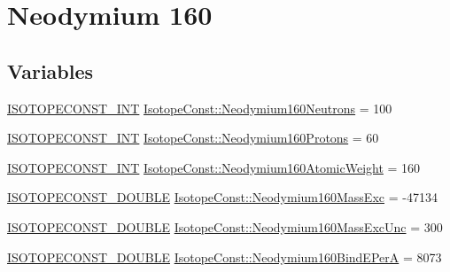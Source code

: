\hypertarget{group___isotope_const-_neodymium-_nd160}{}\section{Neodymium 160}
\label{group___isotope_const-_neodymium-_nd160}
\subsection*{Variables}
\begin{DoxyCompactItemize}
\item 
\mbox{\hyperlink{group___isotope_const-_macros_ga5f18360b3e99483a35c32d789e62621c}{I\+S\+O\+T\+O\+P\+E\+C\+O\+N\+S\+T\+\_\+\+I\+NT}} \mbox{\hyperlink{group___isotope_const-_neodymium-_nd160_ga859d07954675a115b2733ed6a543b1ed}{Isotope\+Const\+::\+Neodymium160\+Neutrons}} = 100
\item 
\mbox{\hyperlink{group___isotope_const-_macros_ga5f18360b3e99483a35c32d789e62621c}{I\+S\+O\+T\+O\+P\+E\+C\+O\+N\+S\+T\+\_\+\+I\+NT}} \mbox{\hyperlink{group___isotope_const-_neodymium-_nd160_ga68f7081078946e74a486992303ad69ca}{Isotope\+Const\+::\+Neodymium160\+Protons}} = 60
\item 
\mbox{\hyperlink{group___isotope_const-_macros_ga5f18360b3e99483a35c32d789e62621c}{I\+S\+O\+T\+O\+P\+E\+C\+O\+N\+S\+T\+\_\+\+I\+NT}} \mbox{\hyperlink{group___isotope_const-_neodymium-_nd160_gafba158a45db58795622e61f0ecb3da19}{Isotope\+Const\+::\+Neodymium160\+Atomic\+Weight}} = 160
\item 
\mbox{\hyperlink{group___isotope_const-_macros_ga8f45a7272ce02c0b4c65c44636ed719a}{I\+S\+O\+T\+O\+P\+E\+C\+O\+N\+S\+T\+\_\+\+D\+O\+U\+B\+LE}} \mbox{\hyperlink{group___isotope_const-_neodymium-_nd160_ga83e020ee131bd3d1e671ee97cba31f00}{Isotope\+Const\+::\+Neodymium160\+Mass\+Exc}} = -\/47134
\item 
\mbox{\hyperlink{group___isotope_const-_macros_ga8f45a7272ce02c0b4c65c44636ed719a}{I\+S\+O\+T\+O\+P\+E\+C\+O\+N\+S\+T\+\_\+\+D\+O\+U\+B\+LE}} \mbox{\hyperlink{group___isotope_const-_neodymium-_nd160_ga3506365e362f5f89a28a04f76435516e}{Isotope\+Const\+::\+Neodymium160\+Mass\+Exc\+Unc}} = 300
\item 
\mbox{\hyperlink{group___isotope_const-_macros_ga8f45a7272ce02c0b4c65c44636ed719a}{I\+S\+O\+T\+O\+P\+E\+C\+O\+N\+S\+T\+\_\+\+D\+O\+U\+B\+LE}} \mbox{\hyperlink{group___isotope_const-_neodymium-_nd160_gae0840c2d4cbb15df3bb0e8dff23f5770}{Isotope\+Const\+::\+Neodymium160\+Bind\+E\+PerA}} = 8073
\item 

\end{DoxyCompactItemize}
